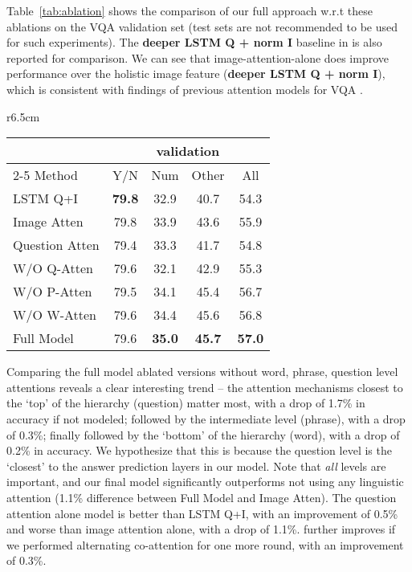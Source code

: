 \documentclass{article}
\begin{document}
Table~\ref{tab:ablation} shows the comparison of our full approach w.r.t these ablations on the VQA validation set (test sets are not recommended to be used for such experiments). The \textbf{deeper LSTM Q + norm I} baseline in \citep{antol2015vqa} is also reported for comparison. We can see that image-attention-alone does improve performance over the holistic image feature (\textbf{deeper LSTM Q + norm I}), which is consistent with findings of previous attention models for VQA \cite{xiong2016dynamic, yang2015stacked}.

\begin{wraptable}{r}{6.5cm}\footnotesize
    \centering
    \label{tab:ablation}
    \begin{tabular}{l c c c c}
    \toprule
    \multicolumn{1}{c}{}   & \multicolumn{4}{c}{validation} \\
    \cmidrule{2-5}
    Method  & Y/N  & Num & Other & All \\
    \midrule	    
    LSTM Q+I & \textbf{79.8} & 32.9 & 40.7 & 54.3 \\
	Image Atten & 79.8& 33.9& 43.6& 55.9\\   	
	Question Atten & 79.4& 33.3& 41.7& 54.8\\
    W/O Q-Atten &79.6 &  32.1&  42.9&  55.3\\ 
    W/O P-Atten & 79.5& 34.1& 45.4& 56.7\\
    W/O W-Atten & 79.6& 34.4& 45.6& 56.8\\
   	Full Model & 79.6 &  \textbf{35.0} & \textbf{45.7} & \textbf{57.0}\\
    \bottomrule
    \end{tabular}       
\end{wraptable}
Comparing the full model \wrt ablated versions without {word, phrase, question} level attentions reveals a clear interesting trend -- the attention mechanisms closest to the `top' of the hierarchy (\ie question) matter most, with a drop of 1.7\% in accuracy if not modeled; followed by the intermediate level (\ie phrase), with a drop of 0.3\%; finally followed by the `bottom' of the hierarchy (\ie word), with a drop of 0.2\% in accuracy. We hypothesize that this is because the question level is the `closest' to the answer prediction layers in our model. Note that \emph{all} levels are important, and our final model significantly outperforms not using any linguistic attention (1.1\% difference between Full Model and Image Atten). The question attention alone model is better than LSTM Q+I, with an improvement of 0.5\% and worse than image attention alone, with a drop of 1.1\%.  further improves if we performed alternating co-attention for one more round, with an improvement of 0.3\%.
\end{document}
